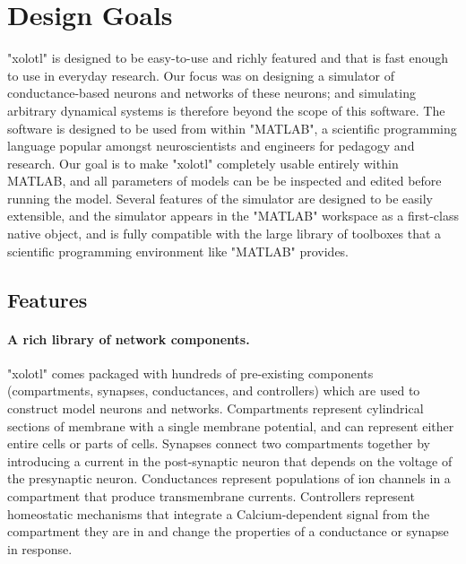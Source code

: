 \documentclass{frontiersSCNS} %
\begin{document}
%
%
%
%
%
%

\section{Design Goals}
\label{design}

"xolotl" is designed to be easy-to-use and richly featured and that is fast enough to use in everyday research. Our focus was on designing a simulator of conductance-based neurons and networks of these neurons; and simulating arbitrary dynamical systems is therefore beyond the scope of this software. The software is designed to be used from within "MATLAB", a scientific programming language popular amongst neuroscientists and engineers for pedagogy and research. Our goal is to make "xolotl" completely usable entirely within MATLAB, and all parameters of models can be be inspected and edited before running the model. Several features of the simulator are designed to be easily extensible, and the simulator appears in the "MATLAB" workspace as a first-class native object, and is fully compatible with the large library of toolboxes that a scientific programming environment like "MATLAB" provides. 

\subsection{Features}
\label{features}

\paragraph{A rich library of network components.} "xolotl" comes packaged with hundreds of pre-existing components (compartments, synapses, conductances, and controllers) which are used to construct model neurons and networks. Compartments represent cylindrical sections of membrane with a single membrane potential, and can represent either entire cells or parts of cells. Synapses connect two compartments together by introducing a current in the post-synaptic neuron that depends on the voltage of the presynaptic neuron. Conductances represent populations of ion channels in a compartment that produce transmembrane currents. Controllers represent homeostatic mechanisms that integrate a Calcium-dependent signal from the compartment they are in and  change the properties of a conductance or synapse in response.
\end{document}
